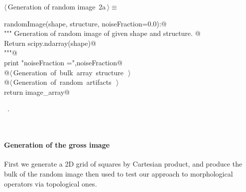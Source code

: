 \documentclass[11pt,oneside]{article}	%
\begin{document}
\begin{flushleft} \small
\begin{minipage}{\linewidth} \label{scrap1}
\protect{}$\langle\,$Generation of random image\nobreak\ {\footnotesize 2a}$\,\rangle\equiv$
\vspace{-1ex}
\begin{list}{}{} \item
\mbox{}\verb@def randomImage(shape, structure, noiseFraction=0.0):@\\
\mbox{}\verb@   """ Generation of random image of given shape and structure. @\\
\mbox{}\verb@      Return scipy.ndarray(shape)@\\
\mbox{}\verb@   """@\\
\mbox{}\verb@   print "noiseFraction =",noiseFraction@\\
\mbox{}\verb@   @\hbox{$\langle\,$Generation of bulk array structure\nobreak\ {\footnotesize {}}$\,\rangle$}\verb@@\\
\mbox{}\verb@   @\hbox{$\langle\,$Generation of random artifacts\nobreak\ {\footnotesize {}}$\,\rangle$}\verb@@\\
\mbox{}\verb@   return image_array@\\
\mbox{}\verb@@{\NWsep}
\end{list}
\vspace{-1ex}
\footnotesize\addtolength{\baselineskip}{-1ex}
\begin{list}{}{\setlength{\itemsep}{-\parsep}\setlength{\itemindent}{-\leftmargin}}
\item \NWtxtMacroRefIn\ .
\end{list}
\end{minipage}\\[4ex]
\end{flushleft}


\paragraph{Generation of the gross image}
First we generate a 2D grid of squares by Cartesian product, and produce the bulk of the random image then used to test our approach to morphological operators via topological ones.
\end{document}
